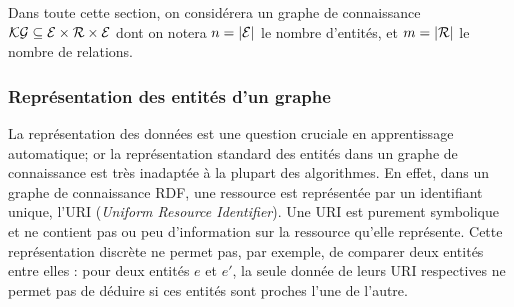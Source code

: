 

Dans toute cette section, on considérera un graphe de connaissance $\mathcal{KG} \subseteq \mathcal{E} \times \mathcal{R} \times \mathcal{E}$ dont on notera $n = | \mathcal{E} |$ le nombre d'entités, et $m = |\mathcal{R} |$ le nombre de relations.


\subsubsection{Représentation des entités d'un graphe}
\newcommand{\URI}{\operatorname{URI}}
\newcommand{\Adja}{\operatorname{Adj}}

La représentation des données est une question cruciale en apprentissage automatique; or la représentation standard des entités dans un graphe de connaissance est très inadaptée à la plupart des algorithmes. En effet, dans un graphe de connaissance RDF, une ressource est représentée par un identifiant unique, l'URI (\textit{Uniform Resource Identifier}). 
Une URI est purement symbolique et ne contient pas ou peu d'information sur la ressource qu'elle représente. Cette représentation discrète ne permet pas, par exemple, de comparer deux entités entre elles : pour deux entités $e$ et $e'$, la seule donnée de leurs URI respectives ne permet pas de déduire si ces entités sont proches l'une de l'autre. %

